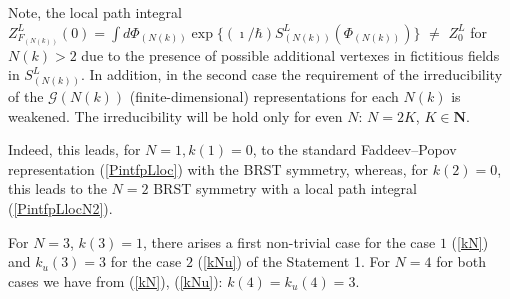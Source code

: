 \documentclass[10pt]{article}
\begin{document}
 \vspace{1ex}
 \noindent
  Note, the  local path integral $Z^L_{F_{(N(k))}}(0) = \int  d \Phi_{(N(k))}\exp\{(\imath/\hbar) S^L_{(N(k))}(\Phi_{(N(k))})\}$ $\ne $ $Z^L_0$ for $N(k)>2$   due to the presence of possible  additional vertexes in fictitious fields in $S^L_{(N(k))}$. In addition, in the second case the requirement of the irreducibility of the $\mathcal{G}(N(k))$ (finite-dimensional) representations for each $N(k)$ is weakened. The irreducibility will be hold only for even $N$: $N=2K$, $K\in \mathbf{N}$.

  Indeed, this leads, for $N=1, k(1)=0$, to the standard Faddeev--Popov representation
(\ref{PintfpLloc}) with the BRST symmetry, whereas, for $k(2)=0 $, this leads
to the $N=2$ BRST symmetry with a local path integral (\ref{PintfpLlocN2}).

For $N=3$, $k(3) = 1$, there arises a first non-trivial case for the case $1$ (\ref{kN}) and $k_u(3)=3$ for the case $2$ (\ref{kNu}) of the Statement 1.
For $N=4$ for both cases we have from (\ref{kN}), (\ref{kNu}): $k(4) = k_u(4) = 3$.
\end{document}
